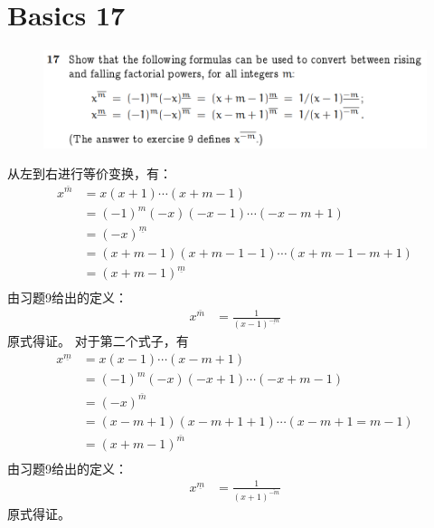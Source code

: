 \documentclass[]{article}
\begin{document}
\section*{Basics 17}
\begin{figure}[H]
    \includegraphics[scale = 1]{Q3.png}
\end{figure}
从左到右进行等价变换，有：
\begin{align}
    x^{\bar{m}} &= x(x+1) \cdots (x+m-1)\\
    &=(-1)^m(-x)(-x-1) \cdots (-x-m+1)\\
    &=(-x)^{\underline{m}}\\
    &=(x+m-1)(x+m-1-1)\cdots(x+m-1-m+1)\\
    &=(x+m-1)^{\underline{m}}\\
\end{align}
由习题9给出的定义：
\begin{align}
    x^{\bar{m}} &= \frac{1}{(x-1)^{\underline{-m}}}
\end{align}
原式得证。
对于第二个式子，有
\begin{align}
    x^{\underline{m}} &= x(x-1) \cdots (x-m+1)\\
    &=(-1)^m(-x)(-x+1) \cdots (-x+m-1)\\
    &=(-x)^{\bar{m}}\\
    &=(x-m+1)(x-m+1+1)\cdots(x-m+1=m-1)\\
    &=(x+m-1)^{\bar{m}}\\
\end{align}
由习题9给出的定义：
\begin{align}
    x^{\underline{m}} &= \frac{1}{(x+1)^{\bar{-m}}}
\end{align}
原式得证。
\end{document}
